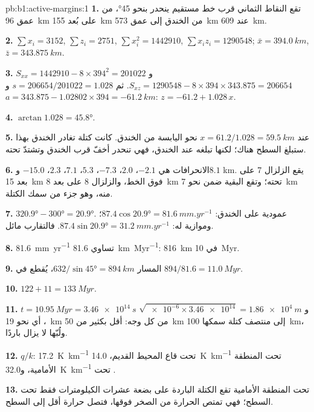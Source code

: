 \begin{solution}{pb:b1:active-margins:1}
\textbf{1.} تقع النقاط الثماني قرب خط مستقيم ينحدر بنحو \ang{45}، من عمق \qty{96}{km} على بُعد \qty{155}{km} من الخندق إلى عمق \qty{573}{km} عند \qty{609}{km}.

\textbf{2.} $\sum x_i = 3152$, $\sum z_i = 2751$, $\sum x_i^2 = \num{1442910}$,
$\sum x_i z_i = \num{1290548}$; $\bar x = \qty{394.0}{km}$,
$\bar z = \qty{343.875}{km}$.

\textbf{3.} $S_{xx} = 1442910 - 8\times394^2 = \num{201022}$ و$S_{xz} = 1290548 - 8\times394\times343.875 = \num{206654}$. ثم $s = 206654/201022 = 1.028$ و$a = 343.875 - 1.02802\times394 =
\qty{-61.2}{km}$: $z = -61.2 + 1.028\,x$.

\textbf{4.} $\arctan1.028 = \ang{45.8}$.

\textbf{5.} عند $x = 61.2/1.028 = \qty{59.5}{km}$ نحو اليابسة من الخندق. كانت كتلة تغادر الخندق بهذا  ستبلغ السطح هناك؛ لكنها تبلغه عند الخندق، فهي تنحدر أخفّ قرب الخندق وتشتدّ تحته.

\textbf{6.} الانحرافات هي $-2.1$، $2.0$، $-7.3$، $5.3$، $7.1$، $2.3$، $-15.0$ و$8.1$ \unit{km}. يقع الزلزال 7 على بعد \qty{15}{km} فوق الخط، والزلزال 8 على بعد \qty{8}{km} تحته؛ وتقع البقية ضمن نحو \qty{7}{km} منه، وهو جزء من سمك الكتلة.

\textbf{7.} $\ang{320.9} - \ang{300} = \ang{20.9}$. عمودية على الخندق: $87.4\cos\ang{20.9} = \qty{81.6}{mm.yr^{-1}}$؛ وموازية له:
$87.4\sin\ang{20.9} = \qty{31.2}{mm.yr^{-1}}$. فالتقارب مائل.

\textbf{8.} \qty{81.6}{mm.yr^{-1}} تساوي \qty{81.6}{km.Myr^{-1}}: \qty{816}{km} في \qty{10}{Myr}.

\textbf{9.} المسار $632/\sin\ang{45} = \qty{894}{km}$، يُقطع في
$894/81.6 = \qty{11.0}{Myr}$.

\textbf{10.} $122 + 11 = \qty{133}{Myr}$.

\textbf{11.} $t = \qty{10.95}{Myr} = \qty{3.46e14}{s}$ و
$\sqrt{\num{e-6}\times\num{3.46e14}} = \qty{1.86e4}{m}$، أي نحو \qty{19}{km} من كل وجه: أقل بكثير من \qty{50}{km} إلى منتصف كتلة سمكها \qty{100}{km}، ولُبّها لا يزال باردًا.

\textbf{12.} $q/k$: \qty{17.2}{K.km^{-1}} تحت قاع المحيط القديم،
\qty{14.0}{K.km^{-1}} تحت المنطقة الأمامية، و\qty{32.0}{K.km^{-1}} تحت .

\textbf{13.} تحت المنطقة الأمامية تقع الكتلة الباردة على بضعة عشرات الكيلومترات فقط تحت السطح؛ فهي تمتص الحرارة من الصخر فوقها، فتصل حرارة أقل إلى السطح.


\end{solution}

